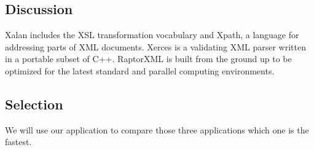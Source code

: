 \subsection{Discussion}
Xalan includes the XSL transformation vocabulary and Xpath, a language for addressing parts of XML documents.
Xerces is a validating XML parser written in a portable subset of C++.  
RaptorXML is built from the ground up to be optimized for the latest standard and parallel computing environments.
\subsection{Selection}

We will use our application to compare those three applications which one is the fastest. 
